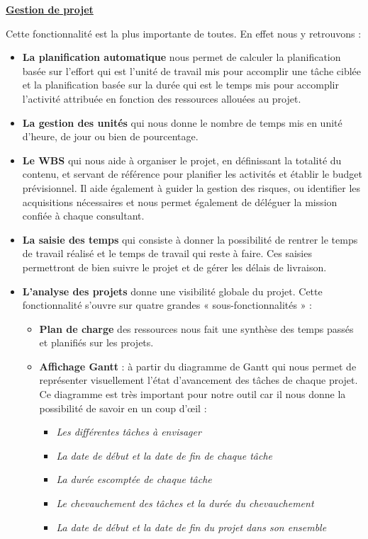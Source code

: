 \documentclass[11pt]{report}
\begin{document}
\begin{center}
\underline{\textbf{Gestion de projet}} 
\end{center}
Cette fonctionnalité est la plus importante de toutes. En effet nous y retrouvons : 
\begin{itemize}
	\item \textbf{La planification automatique} nous permet de calculer la planification basée sur l’effort qui est l’unité de travail mis pour accomplir une tâche ciblée et la planification basée sur la durée qui est le temps mis pour accomplir l’activité attribuée en fonction des ressources allouées au projet.
	
	\item \textbf{La gestion des unités} qui nous donne le nombre de temps mis en unité d’heure, de jour ou bien de pourcentage.
	
	\item \textbf{Le WBS} qui nous aide à organiser le projet, en définissant la totalité du contenu, et servant de référence pour planifier les activités et établir le budget prévisionnel. Il aide également à guider la gestion des risques, ou identifier les acquisitions nécessaires et nous permet également de déléguer la mission confiée à chaque consultant. 
	
	\item\textbf{ La saisie des temps} qui consiste à donner la possibilité de rentrer le temps de travail réalisé et le temps de travail qui reste à faire. Ces saisies permettront de bien suivre le projet et de gérer les délais de livraison. 
	
	\item \textbf{L’analyse des projets} donne une visibilité globale du projet. Cette fonctionnalité s’ouvre sur quatre grandes « sous-fonctionnalités » :
	
	\begin{itemize}
		\item \textbf{Plan de charge} des ressources nous fait une synthèse des temps passés et planifiés sur les projets. 
		
		\item \textbf{Affichage Gantt} : à partir du diagramme de Gantt qui nous permet de représenter visuellement l’état d’avancement des tâches de chaque projet. Ce diagramme est très important pour notre outil car il nous donne la possibilité de savoir en un coup d’œil :
		
		\begin{itemize}
			\item \textit{Les différentes tâches à envisager}
			\item \textit{La date de début et la date de fin de chaque tâche}
			\item \textit{La durée escomptée de chaque tâche}
			\item \textit{Le chevauchement des tâches et la durée du chevauchement}
			\item \textit{La date de début et la date de fin du projet dans son ensemble}
		\end{itemize}
		

\end{itemize}
\end{itemize}
\end{document}
